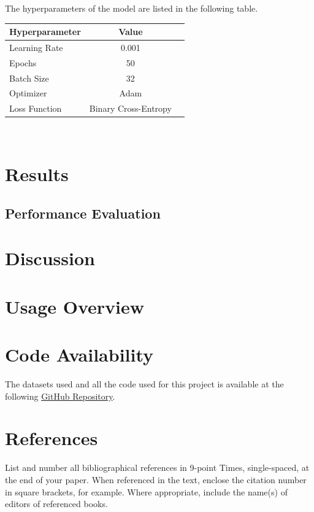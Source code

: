 \documentclass[10pt,twocolumn,letterpaper]{article}
\begin{document}

The hyperparameters of the model are listed in the following table. \\

\begin{center}
\begin{tabular}{lcc}
    \toprule
    Hyperparameter & Value \\
    \midrule
    Learning Rate & 0.001 \\
    Epochs & 50 \\
    Batch Size & 32 \\
    Optimizer & Adam \\
    Loss Function & Binary Cross-Entropy\\
    \bottomrule
\end{tabular} \\
\end{center}


\section{Results}

\subsection{Performance Evaluation}

\section{Discussion}

\section{Usage Overview}

\section{Code Availability}
The datasets used and all the code used for this project is available
at the following \href{https://github.com/marcouderzo/BioData-ProteinFunctionPrediction}{GitHub Repository}.



\section{References}

List and number all bibliographical references in 9-point Times,
single-spaced, at the end of your paper. When referenced in the text,
enclose the citation number in square brackets, for
example.  Where appropriate, include the name(s) of
editors of referenced books.

%
%
\end{document}
